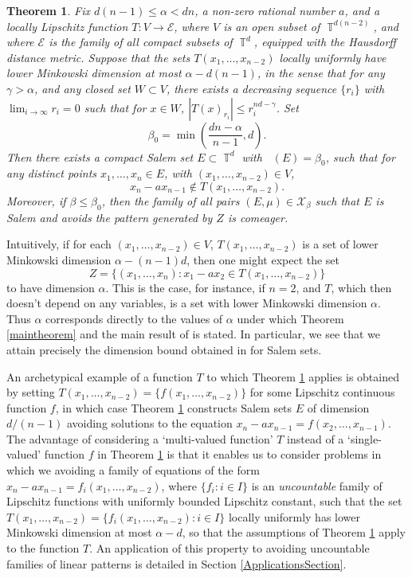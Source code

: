 \documentclass[dvipsnames,letterpaper,12pt]{article}
\numberwithin{equation}{section}
\DeclareMathOperator{\fordim}{\dim_{\mathbb{F}}}
\DeclareMathOperator{\TT}{\mathbb{T}}
\newtheorem{theorem}{Theorem}
\numberwithin{theorem}{section}
\begin{document}
\begin{theorem} \label{thirdTheorem}
    Fix $d(n-1) \leq \alpha < dn$, a non-zero rational number $a$, and a locally Lipschitz function $T: V \to \mathcal{E}$, where $V$ is an open subset of $\TT^{d(n-2)}$, and where $\mathcal{E}$ is the family of all compact subsets of $\TT^d$, equipped with the Hausdorff distance metric. Suppose that the sets $T(x_1,\dots,x_{n-2})$ \emph{locally uniformly} have lower Minkowski dimension at most $\alpha - d(n-1)$, in the sense that for any $\gamma > \alpha$, and any closed set $W \subset V$, there exists a decreasing sequence $\{ r_i \}$ with $\lim_{i \to \infty} r_i = 0$ such that for $x \in W$, $|T(x)_{r_i}| \leq r_i^{nd-\gamma}$. Set
    \[ \beta_0 = \min \left( \frac{dn - \alpha}{n-1}, d \right). \]
    Then there exists a compact Salem set $E \subset \TT^d$ with $\fordim(E) = \beta_0$, such that for any distinct points $x_1,\dots,x_n \in E$, with $(x_1,\dots,x_{n-2}) \in V$,
    \[ x_n - a x_{n-1} \not \in T(x_1,\dots,x_{n-2}). \]
    Moreover, if $\beta \leq \beta_0$, then the family of all pairs $(E,\mu) \in \mathcal{X}_\beta$ such that $E$ is Salem and avoids the pattern generated by $Z$ is comeager.
\end{theorem}

Intuitively, if for each $(x_1,\dots,x_{n-2}) \in V$, $T(x_1,\dots,x_{n-2})$ is a set of lower Minkowski dimension $\alpha - (n-1)d$, then one might expect the set
%
\[ Z = \{ (x_1,\dots,x_n): x_1 - ax_2 \in T(x_1,\dots,x_{n-2}) \} \]
%
to have dimension $\alpha$. This is the case, for instance, if $n = 2$, and $T$, which then doesn't depend on any variables, is a set with lower Minkowski dimension $\alpha$. Thus $\alpha$ corresponds directly to the values of $\alpha$ under which Theorem \ref{maintheorem} and the main result of \cite{OurPaper} is stated. In particular, we see that we attain precisely the dimension bound obtained in \cite{OurPaper} for Salem sets.

An archetypical example of a function $T$ to which Theorem \ref{thirdTheorem} applies is obtained by setting $T(x_1,\dots,x_{n-2}) = \{ f(x_1,\dots,x_{n-2}) \}$ for some Lipschitz continuous function $f$, in which case Theorem \ref{thirdTheorem} constructs Salem sets $E$ of dimension $d/(n-1)$ avoiding solutions to the equation $x_n - a x_{n-1} = f(x_2,\dots,x_{n-1})$. The advantage of considering a `multi-valued function' $T$ instead of a `single-valued' function $f$ in Theorem \ref{thirdTheorem} is that it enables us to consider problems in which we avoiding a family of equations of the form $x_n - ax_{n-1} = f_i(x_1,\dots,x_{n-2})$, where $\{ f_i : i \in I \}$ is an \emph{uncountable} family of Lipschitz functions with uniformly bounded Lipschitz constant, such that the set $T(x_1,\dots,x_{n-2}) = \{ f_i(x_1,\dots,x_{n-2}) : i \in I \}$ locally uniformly has lower Minkowski dimension at most $\alpha - d$, so that the assumptions of Theorem \ref{thirdTheorem} apply to the function $T$. An application of this property to avoiding uncountable families of linear patterns is detailed in Section \ref{ApplicationsSection}.
\end{document}
